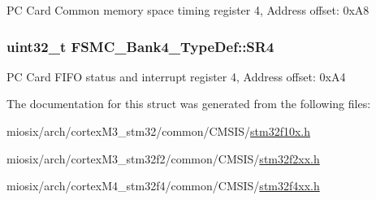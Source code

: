 P\-C Card Common memory space timing register 4, Address offset\-: 0x\-A8 \hypertarget{struct_f_s_m_c___bank4___type_def_a1e0f09be7fa48bb7b14233866da1dd9f}{
\subsubsection[{S\-R4}]{ uint32\-\_\-t F\-S\-M\-C\-\_\-\-Bank4\-\_\-\-Type\-Def\-::\-S\-R4}}\label{struct_f_s_m_c___bank4___type_def_a1e0f09be7fa48bb7b14233866da1dd9f}
P\-C Card F\-I\-F\-O status and interrupt register 4, Address offset\-: 0x\-A4 

The documentation for this struct was generated from the following files\-:\begin{DoxyCompactItemize}
\item 
miosix/arch/cortex\-M3\-\_\-stm32/common/\-C\-M\-S\-I\-S/\hyperlink{stm32f10x_8h}{stm32f10x.\-h}\item 
miosix/arch/cortex\-M3\-\_\-stm32f2/common/\-C\-M\-S\-I\-S/\hyperlink{stm32f2xx_8h}{stm32f2xx.\-h}\item 
miosix/arch/cortex\-M4\-\_\-stm32f4/common/\-C\-M\-S\-I\-S/\hyperlink{stm32f4xx_8h}{stm32f4xx.\-h}\end{DoxyCompactItemize}
